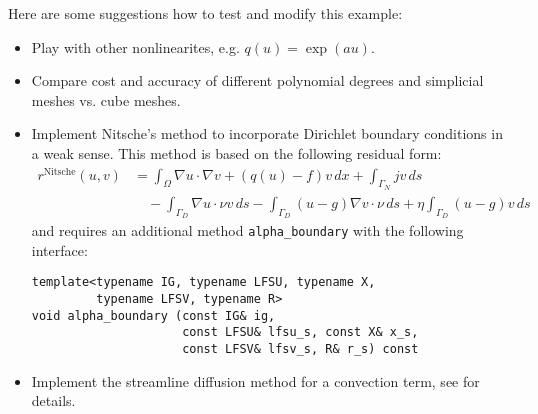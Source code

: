 \documentclass[a4paper,12pt]{article}
\begin{document}
Here are some suggestions how to test and modify this example:
\begin{itemize}
\item Play with other nonlinearites, e.g. $q(u)=\exp(au)$.
\item Compare cost and accuracy of different polynomial degrees and
simplicial meshes vs. cube meshes.
\item Implement Nitsche's method to incorporate Dirichlet boundary conditions
in a weak sense. This method is based on the following residual form:
\begin{equation*}
\begin{split}
r^{\text{Nitsche}}(u,v) &= \int_\Omega \nabla u \cdot \nabla v + (q(u)-f)v\,dx + \int_{\Gamma_N} jv\,ds \\
&\quad - \int_{\Gamma_D} \nabla u \cdot\nu v\,ds - \int_{\Gamma_D} (u-g)\nabla v \cdot\nu\,ds
+ \eta \int_{\Gamma_D} (u-g)v\,ds
\end{split}
\end{equation*}
and requires an additional method \lstinline{alpha_boundary} with the following interface:
\begin{lstlisting}[basicstyle=\ttfamily\small,
frame=single,
backgroundcolor=\color{listingbg}]
template<typename IG, typename LFSU, typename X,
         typename LFSV, typename R>
void alpha_boundary (const IG& ig,
                     const LFSU& lfsu_s, const X& x_s,
                     const LFSV& lfsv_s, R& r_s) const
\end{lstlisting}

\item Implement the streamline diffusion method for a convection term, see \cite{Elman2005} for details.
\end{itemize}



\end{document}

